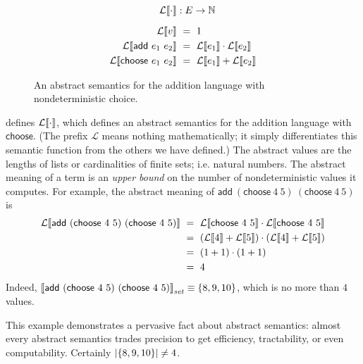 \newcommand{\Count}[1]{\mathcal{L}\!\meaningof{#1}}

\begin{figure}[tb]\centering
\begin{varwidth}[b]{\textwidth}
\begin{equation*}
\begin{aligned}
	\Count{\cdot} &: E \to \Nat
	\\[6pt]
	\Count{v} &\ =\ 1 \\
	\Count{\mathsf{add}~e_1~e_2} &\ =\ \Count{e_1} \cdot \Count{e_2} \\
	\Count{\mathsf{choose}~e_1~e_2} &\ =\ \Count{e_1} + \Count{e_2}  \\
\end{aligned}
\end{equation*}
\end{varwidth}
\bottomhrule
\caption[Abstract semantics with nondeterminism]{An abstract semantics for the addition language with nondeterministic choice.}
\label{fig:add-choose-abstract}
\end{figure}

 defines $\Count{\cdot}$, which defines an abstract semantics for the addition language with $\mathsf{choose}$.
(The prefix $\mathcal{L}$ means nothing mathematically; it simply differentiates this semantic function from the others we have defined.)
The abstract values are the lengths of lists or cardinalities of finite sets; i.e. natural numbers.
The abstract meaning of a term is an \emph{upper bound} on the number of nondeterministic values it computes.
For example, the abstract meaning of $\mathsf{add}~(\mathsf{choose}~4~5)~(\mathsf{choose}~4~5)$ is
\begin{equation}
\begin{aligned}
	\Count{\mathsf{add}~(\mathsf{choose}~4~5)~(\mathsf{choose}~4~5)}
	&\ =\ \Count{\mathsf{choose}~4~5} \cdot \Count{\mathsf{choose}~4~5}
\\
	&\ =\ (\Count{4} + \Count{5}) \cdot (\Count{4} + \Count{5})
\\
	&\ =\ (1 + 1) \cdot (1 + 1)
\\
	&\ =\ 4
\end{aligned}
\end{equation}
Indeed, $\left\llbracket{\mathsf{add}~(\mathsf{choose}~4~5)~(\mathsf{choose}~4~5)}\right\rrbracket_\mathit{set} \equiv \{{8,9,10}\}$, which is no more than $4$ values.

This example demonstrates a pervasive fact about abstract semantics: almost every abstract semantics trades precision to get efficiency, tractability, or even computability.
Certainly $\left|\{{8,9,10}\}\right| \neq 4$.

